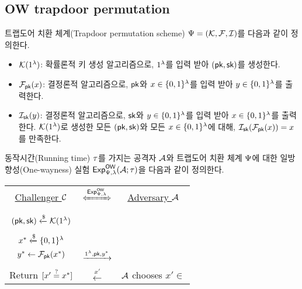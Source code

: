 \documentclass{article}
\theoremstyle{definition}
\begin{document}

\subsection{OW trapdoor permutation}
트랩도어 치환 체계(Trapdoor permutation scheme) $\tdsch = (\genkey, \td, \itd)$를 다음과
같이 정의한다.
\begin{itemize}
	\item $\genkey(1^{\sp})$: 확률론적 키 생성 알고리즘으로, $1^{\sp}$를 입력
	받아 $(\pk, \sk)$를 생성한다.
	\item $\td_{\pk}(x)$: 결정론적 알고리즘으로, $\pk$와 $x \in \set{0, 1}^{\sp}$를 입력 받아
	$y \in \set{0 ,1}^{\sp}$를 출력한다.
	\item $\itd_{\sk}(y)$: 결정론적 알고리즘으로, $\sk$와 $y \in \set{0,
	1}^{\sp}$를 입력 받아 $x \in \set{0, 1}^{\sp}$를 출력한다.
	$\genkey(1^{\sp})$로 생성한 모든 $(\pk, \sk)$와 모든 $x \in \set{0,
	1}^{\sp}$에 대해, $\itd_{\sk}(\td_{\pk}(x)) = x$를 만족한다.
\end{itemize}
동작시간(Running time) $\rt$를 가지는 공격자 $\adv$와 트랩도어 치환 체계
$\tdsch$에 대한 일방향성(One-wayness) 실험 $\Exp^{\ow}_{\tdsch, \sp}(\adv; \rt)$을
다음과 같이 정의한다.
\begin{tcolorbox}[colback=white]
	\centering
	\begin{tabularx}{\linewidth}{CcC}
		\underline{Challenger $\ch$} & $\xLeftrightarrow{\Exp^{\ow}_{\tdsch, \sp}}$ & \underline{Adversary $\adv$} \\
		\\
		$(\pk, \sk) \rgets \genkey(1^{\sp})$ & & \\
		\\
		$x^* \rgets \set{0, 1}^{\sp}$ \\ $y^* \gets \td_{\pk}(x^*)$ & $\xrightarrow{1^{\sp}, \pk, y^*}$ & \\
		\\ 
		Return $[x' \same x^*]$ & $\xleftarrow{x'}$ & $\adv$ chooses $x' \in \xspace$ \\
  \end{tabularx}
\end{tcolorbox}
\end{document}
